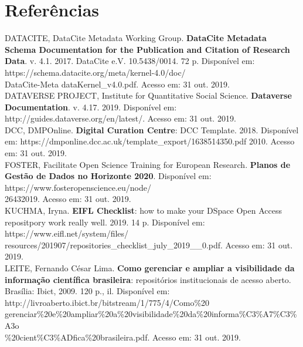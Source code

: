 \documentclass[12pt,hidelinks]{article}
\begin{document}
\newpage

\section{Referências}

\vspace{10.5cm}

DATACITE, DataCite Metadata Working Group. \textbf{DataCite Metadata Schema Documentation for the
Publication and Citation of Research Data}. v. 4.1. 2017. DataCite e.V. 10.5438/0014. 72 p. Disponível em: https://schema.datacite.org/meta/kernel-4.0/doc/\\DataCite-Meta
dataKernel\_v4.0.pdf. Acesso em: 31 out. 2019.\\

\noindent DATAVERSE PROJECT,  Institute for Quantitative Social Science. \textbf{Dataverse Documentation}. v. 4.17. 2019. Disponível em: http://guides.dataverse.org/en/latest/. Acesso em: 31 out. 2019.\\

\noindent DCC, DMPOnline. \textbf{Digital Curation Centre}: DCC Template. 2018. Disponível em: https://dmponline.dcc.ac.uk/template\_export/1638514350.pdf 2010. Acesso em: 31 out. 2019.\\

\noindent FOSTER, Facilitate Open Science Training for European Research. \textbf{Planos de Gestão de Dados no Horizonte 2020}. Disponível em: https://www.fosteropenscience.eu/node/\\26432019. Acesso em: 31 out. 2019.\\

\noindent KUCHMA, Iryna. \textbf{EIFL Checklist}: how to make your DSpace Open Access repositpory work really well. 2019. 14 p. Disponível em: https://www.eifl.net/system/files/\\resources/201907/repositories\_checklist\_july\_2019\_\_0.pdf. Acesso em: 31 out. 2019.\\

\noindent LEITE, Fernando César Lima. \textbf{Como gerenciar e ampliar a visibilidade da informação científica brasileira}: repositórios institucionais de acesso aberto. Brasília: Ibict, 2009. 120 p., il. Disponível em: http://livroaberto.ibict.br/bitstream/1/775/4/Como\%20\\gerenciar\%20e\%20ampliar\%20a\%20visibilidade\%20da\%20informa\%C3\%A7\%C3\%A3o\\\%20cient\%C3\%ADfica\%20brasileira.pdf. Acesso em: 31 out. 2019.\\
\end{document}
